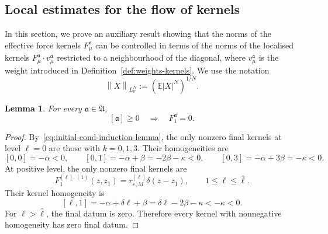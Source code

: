 \documentclass{article}
\numberwithin{equation}{section}
\newcommand{\assign}{:=}
\theoremstyle{plain}
\newtheorem{lemma}[theorem]{Lemma}
\theoremstyle{definition}
\begin{document}
\subsection{Local estimates for the flow of
kernels}\label{sec:localization-of-random-kernels}

In this section, we prove an auxiliary result showing that the norms of the
effective force kernels $F^{\mathfrak{a}}_{\mu}$ can be controlled in terms of
the norms of the localised kernels $F^{\mathfrak{a}}_{\mu} \cdot
v^{\mathfrak{a}}_{\mu}$ restricted to a neighbourhood of the diagonal,
where $v^{\mathfrak{a}}_{\mu}$ is the weight introduced in
Definition~\ref{def:weights-kernels}. We use the notation
\[ \left\| X \right\|_{L_{\mathbb{P}}^N} \assign (\mathbb{E} | X |^N)^{1
   / N} . \]
\begin{lemma}
  \label{lem:nonrelevant-final-data}
  For every $\mathfrak{a} \in \mathfrak{A}$,
  \[
    [\mathfrak{a}] \geqslant 0
    \quad \Longrightarrow \quad
    F_1^{\mathfrak{a}} = 0.
  \]
\end{lemma}

\begin{proof}
  By~\eqref{eq:initial-cond-induction-lemma}, the only nonzero final kernels at
  level $\ell = 0$ are those with $k = 0, 1, 3$. Their homogeneities are
  \[
    [0, 0] = - \alpha < 0,
    \qquad
    [0, 1] = - \alpha + \beta = - 2 \beta - \kappa < 0,
    \qquad
    [0, 3] = - \alpha + 3 \beta = - \kappa < 0.
  \]
  At positive level, the only nonzero final kernels are
  \[
    F_1^{[\ell], (1)}(z,z_1) =
    r_{\varepsilon, M}^{[\ell]} \delta(z-z_1),
    \qquad 1 \leqslant \ell \leqslant \hat{\ell}.
  \]
  Their kernel homogeneity is
  \[
    [\ell, 1] = - \alpha + \delta \ell + \beta
    = \delta \ell - 2 \beta - \kappa
    < - \kappa < 0.
  \]
  For $\ell > \hat{\ell}$, the final datum is zero. Therefore every kernel
  with nonnegative homogeneity has zero final datum.
\end{proof}
\end{document}
